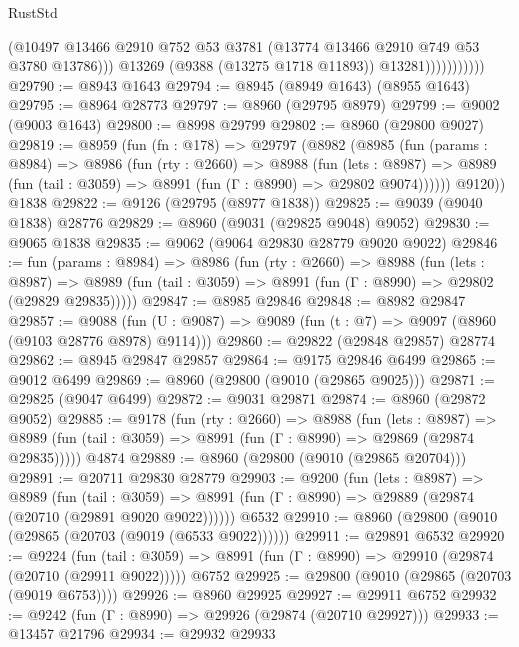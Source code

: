 \begin{lexlean}{RustStd}
\begin{coremodule}
                            (@10497
                              @13466
                              @2910
                              @752
                              @53
                              @3781
                              (@13774 @13466 @2910 @749 @53 @3780 @13786)))
                          @13269
                          (@9388 (@13275 @1718 @11893))
                          @13281)))))))))))
@29790 := @8943 @1643
@29794 := @8945 (@8949 @1643) (@8955 @1643)
@29795 := @8964 @28773
@29797 := @8960 (@29795 @8979)
@29799 := @9002 (@9003 @1643)
@29800 := @8998 @29799
@29802 := @8960 (@29800 @9027)
@29819 := @8959
    (fun (fn : @178) =>
    @29797
      (@8982
        (@8985
          (fun (params : @8984) =>
          @8986
            (fun (rty : @2660) =>
            @8988
              (fun (lets : @8987) =>
              @8989 (fun (tail : @3059) => @8991 (fun (Γ : @8990) => @29802 @9074))))))
        @9120))
    @1838
@29822 := @9126 (@29795 (@8977 @1838))
@29825 := @9039 (@9040 @1838) @28776
@29829 := @8960 (@9031 (@29825 @9048) @9052)
@29830 := @9065 @1838
@29835 := @9062 (@9064 @29830 @28779 @9020 @9022)
@29846 := fun (params : @8984) =>
  @8986
    (fun (rty : @2660) =>
    @8988
      (fun (lets : @8987) =>
      @8989 (fun (tail : @3059) => @8991 (fun (Γ : @8990) => @29802 (@29829 @29835)))))
@29847 := @8985 @29846
@29848 := @8982 @29847
@29857 := @9088
    (fun (U : @9087) => @9089 (fun (t : @7) => @9097 (@8960 (@9103 @28776 @8978) @9114)))
@29860 := @29822 (@29848 @29857) @28774
@29862 := @8945 @29847 @29857
@29864 := @9175 @29846 @6499
@29865 := @9012 @6499
@29869 := @8960 (@29800 (@9010 (@29865 @9025)))
@29871 := @29825 (@9047 @6499)
@29872 := @9031 @29871
@29874 := @8960 (@29872 @9052)
@29885 := @9178
    (fun (rty : @2660) =>
    @8988
      (fun (lets : @8987) =>
      @8989 (fun (tail : @3059) => @8991 (fun (Γ : @8990) => @29869 (@29874 @29835)))))
    @4874
@29889 := @8960 (@29800 (@9010 (@29865 @20704)))
@29891 := @20711 @29830 @28779
@29903 := @9200
    (fun (lets : @8987) =>
    @8989
      (fun (tail : @3059) =>
      @8991 (fun (Γ : @8990) => @29889 (@29874 (@20710 (@29891 @9020 @9022))))))
    @6532
@29910 := @8960 (@29800 (@9010 (@29865 (@20703 (@9019 (@6533 @9022))))))
@29911 := @29891 @6532
@29920 := @9224
    (fun (tail : @3059) => @8991 (fun (Γ : @8990) => @29910 (@29874 (@20710 (@29911 @9022)))))
    @6752
@29925 := @29800 (@9010 (@29865 (@20703 (@9019 @6753))))
@29926 := @8960 @29925
@29927 := @29911 @6752
@29932 := @9242 (fun (Γ : @8990) => @29926 (@29874 (@20710 @29927)))
@29933 := @13457 @21796
@29934 := @29932 @29933

\end{coremodule}
\end{lexlean}
